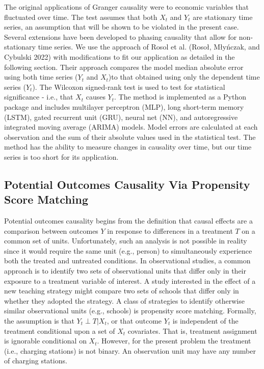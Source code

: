 \documentclass[
  letterpaper,
  DIV=11,
  numbers=noendperiod]{scrartcl}
\begin{document}
The original applications of Granger causality were to economic
variables that fluctuated over time. The test assumes that both \(X_t\)
and \(Y_t\) are stationary time series, an assumption that will be shown
to be violated in the present case. Several extensions have been
developed to phasing causality that allow for non-stationary time
series. We use the approach of Rosol et al. (Rosoł, Młyńczak, and
Cybulski 2022) with modifications to fit our application as detailed in
the following section. Their approach compares the model median absolute
error using both time series (\(Y_t\) and \(X_t\))to that obtained using
only the dependent time series (\(Y_t\)). The Wilcoxon signed-rank test
is used to test for statistical significance - i.e., that \(X_t\) causes
\(Y_t\). The method is implemented as a Python package and includes
multilayer perceptron (MLP), long short-term memory (LSTM), gated
recurrent unit (GRU), neural net (NN), and autoregressive integrated
moving average (ARIMA) models. Model errors are calculated at each
observation and the sum of their absolute values used in the statistical
test. The method has the ability to measure changes in causality over
time, but our time series is too short for its application.

\hypertarget{potential-outcomes-causality-via-propensity-score-matching}{%
\subsection{Potential Outcomes Causality Via Propensity Score
Matching}\label{potential-outcomes-causality-via-propensity-score-matching}}

Potential outcomes causality begins from the definition that causal
effects are a comparison between outcomes \(Y\) in response to
differences in a treatment \(T\) on a common set of units.
Unfortunately, such an analysis is not possible in reality since it
would require the same unit (e.g., person) to simultaneously experience
both the treated and untreated conditions. In observational studies, a
common approach is to identify two sets of observational units that
differ only in their exposure to a treatment variable of interest. A
study interested in the effect of a new teaching strategy might compare
two sets of schools that differ only in whether they adopted the
strategy. A class of strategies to identify otherwise similar
observational units (e.g., schools) is propensity score matching.
Formally, the assumption is that \(Y_t \perp T|X_t\), or that outcome
\(Y_t\) is independent of the treatment conditional upon a set of
\(X_t\) covariates. That is, treatment assignment is ignorable
conditional on \(X_t\). However, for the present problem the treatment
(i.e., charging stations) is not binary. An observation unit may have
any number of charging stations.
\end{document}
